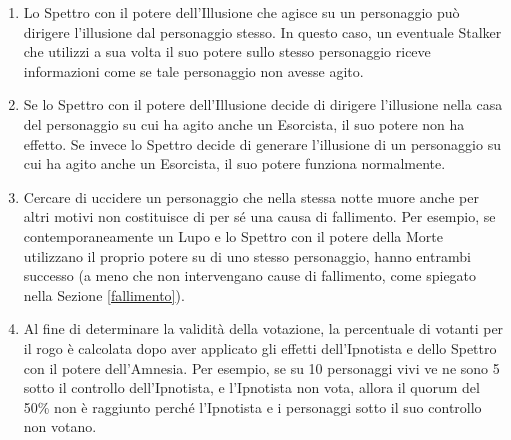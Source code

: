 \documentclass[a4paper,10pt]{article}
\begin{document}
\begin{enumerate}
 
 
 \item Lo Spettro con il potere dell'Illusione che agisce su un personaggio può dirigere l'illusione dal personaggio stesso. In questo caso, un eventuale Stalker che utilizzi a sua volta il suo potere sullo stesso personaggio riceve informazioni come se tale personaggio non avesse agito.
 
 \item  Se lo Spettro con il potere dell'Illusione decide di dirigere l'illusione nella casa del personaggio su cui ha agito anche un Esorcista, il suo potere non ha effetto.
 Se invece lo Spettro decide di generare l'illusione di un personaggio su cui ha agito anche un Esorcista, il suo potere funziona normalmente.
 
 \item Cercare di uccidere un personaggio che nella stessa notte muore anche per altri motivi non costituisce di per sé una causa di fallimento.
 Per esempio, se contemporaneamente un Lupo e lo Spettro con il potere della Morte utilizzano il proprio potere su di uno stesso personaggio, hanno entrambi successo (a meno che non intervengano cause di fallimento, come spiegato nella Sezione \ref{fallimento}).
 
 \item Al fine di determinare la validità della votazione, la percentuale di votanti per il rogo è calcolata dopo aver applicato gli effetti dell'Ipnotista e dello Spettro con il potere dell'Amnesia.
 Per esempio, se su 10 personaggi vivi ve ne sono 5 sotto il controllo dell'Ipnotista, e l'Ipnotista non vota, allora il quorum del 50\% non è raggiunto perché l'Ipnotista e i personaggi sotto il suo controllo non votano.


\end{enumerate}
\end{document}
